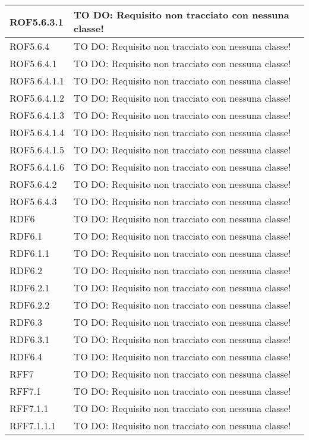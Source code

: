 \begin{center}
\begin{longtable}{| p{2.5cm} | p{11cm} |}
\hline
ROF5.6.3.1 & TO DO: Requisito non tracciato con nessuna classe! \\
\hline
ROF5.6.4 & TO DO: Requisito non tracciato con nessuna classe! \\
\hline
ROF5.6.4.1 & TO DO: Requisito non tracciato con nessuna classe! \\
\hline
ROF5.6.4.1.1 & TO DO: Requisito non tracciato con nessuna classe! \\
\hline
ROF5.6.4.1.2 & TO DO: Requisito non tracciato con nessuna classe! \\
\hline
ROF5.6.4.1.3 & TO DO: Requisito non tracciato con nessuna classe! \\
\hline
ROF5.6.4.1.4 & TO DO: Requisito non tracciato con nessuna classe! \\
\hline
ROF5.6.4.1.5 & TO DO: Requisito non tracciato con nessuna classe! \\
\hline
ROF5.6.4.1.6 & TO DO: Requisito non tracciato con nessuna classe! \\
\hline
ROF5.6.4.2 & TO DO: Requisito non tracciato con nessuna classe! \\
\hline
ROF5.6.4.3 & TO DO: Requisito non tracciato con nessuna classe! \\
\hline
RDF6 & TO DO: Requisito non tracciato con nessuna classe! \\
\hline
RDF6.1 & TO DO: Requisito non tracciato con nessuna classe! \\
\hline
RDF6.1.1 & TO DO: Requisito non tracciato con nessuna classe! \\
\hline
RDF6.2 & TO DO: Requisito non tracciato con nessuna classe! \\
\hline
RDF6.2.1 & TO DO: Requisito non tracciato con nessuna classe! \\
\hline
RDF6.2.2 & TO DO: Requisito non tracciato con nessuna classe! \\
\hline
RDF6.3 & TO DO: Requisito non tracciato con nessuna classe! \\
\hline
RDF6.3.1 & TO DO: Requisito non tracciato con nessuna classe! \\
\hline
RDF6.4 & TO DO: Requisito non tracciato con nessuna classe! \\
\hline
RFF7 & TO DO: Requisito non tracciato con nessuna classe! \\
\hline
RFF7.1 & TO DO: Requisito non tracciato con nessuna classe! \\
\hline
RFF7.1.1 & TO DO: Requisito non tracciato con nessuna classe! \\
\hline
RFF7.1.1.1 & TO DO: Requisito non tracciato con nessuna classe! \\

\end{longtable}
\end{center}
